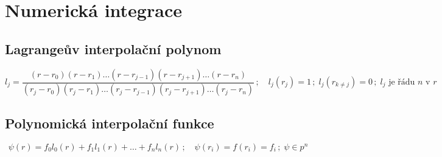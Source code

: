 \documentclass[10pt,oneside]{article}
\begin{document}
\newpage
\section*{Numerická integrace}

\subsection*{Lagrangeův interpolační polynom}
\begin{equation}
l_j = \frac{(r-r_0)(r-r_1)\dots(r-r_{j-1})(r-r_{j+1})\dots(r-r_n)}{(r_j-r_0)(r_j-r_1)\dots(r_j-r_{j-1})(r_j-r_{j+1})\dots(r_j-r_n)}
\,;\quad
l_j(r_j) = 1 \,;\;
l_j(r_{k \neq j}) = 0 \,;\;
l_j \text{ je řádu $n$ v $r$}
\end{equation}

\subsection*{Polynomická interpolační funkce}
\begin{equation}
\psi(r) = f_0 l_0(r) + f_1 l_1(r) + \dots + f_n l_n(r)
\,;\quad
\psi(r_i) = f(r_i) = f_i \,;\;
\psi \in p^n
\end{equation}
\end{document}
